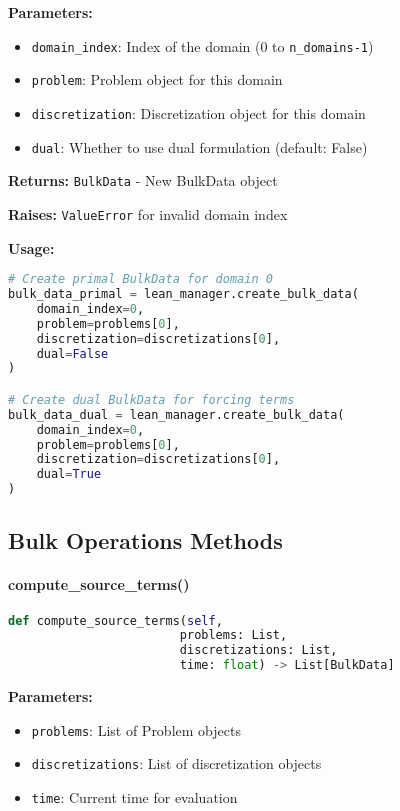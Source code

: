 \textbf{Parameters:}
\begin{itemize}
    \item \texttt{domain\_index}: Index of the domain (0 to \texttt{n\_domains-1})
    \item \texttt{problem}: Problem object for this domain
    \item \texttt{discretization}: Discretization object for this domain
    \item \texttt{dual}: Whether to use dual formulation (default: False)
\end{itemize}

\textbf{Returns:} \texttt{BulkData} - New BulkData object

\textbf{Raises:} \texttt{ValueError} for invalid domain index

\textbf{Usage:}
\begin{lstlisting}[language=Python, caption=BulkData Creation Usage]
# Create primal BulkData for domain 0
bulk_data_primal = lean_manager.create_bulk_data(
    domain_index=0,
    problem=problems[0],
    discretization=discretizations[0],
    dual=False
)

# Create dual BulkData for forcing terms
bulk_data_dual = lean_manager.create_bulk_data(
    domain_index=0,
    problem=problems[0],
    discretization=discretizations[0],
    dual=True
)
\end{lstlisting}

\subsection{Bulk Operations Methods}
\label{subsec:bulk_operations}

\paragraph{compute\_source\_terms()}\leavevmode
\begin{lstlisting}[language=Python, caption=Compute Source Terms Method]
def compute_source_terms(self,
                        problems: List,
                        discretizations: List,
                        time: float) -> List[BulkData]
\end{lstlisting}

\textbf{Parameters:}
\begin{itemize}
    \item \texttt{problems}: List of Problem objects
    \item \texttt{discretizations}: List of discretization objects
    \item \texttt{time}: Current time for evaluation
\end{itemize}

